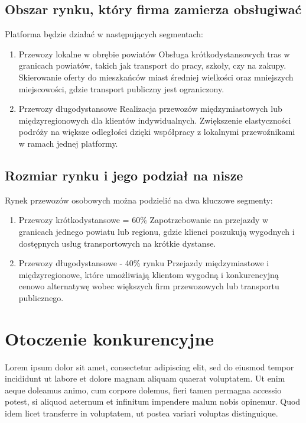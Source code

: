 \subsection{Obszar rynku, który firma zamierza obsługiwać}
Platforma będzie działać w następujących segmentach:
\begin{enumerate}
     
    \item Przewozy lokalne w obrębie powiatów
        Obsługa krótkodystansowych tras w granicach powiatów, takich jak transport do pracy, szkoły, czy na zakupy.
        Skierowanie oferty do mieszkańców miast średniej wielkości oraz mniejszych miejscowości, gdzie transport publiczny jest ograniczony.

    \item Przewozy długodystansowe
        Realizacja przewozów międzymiastowych lub międzyregionowych dla klientów indywidualnych.
        Zwiększenie elastyczności podróży na większe odległości dzięki współpracy z lokalnymi przewoźnikami w ramach jednej platformy.
 
\end{enumerate}      

\subsection{Rozmiar rynku i jego podział na nisze}
    Rynek przewozów osobowych można podzielić na dwa kluczowe segmenty:
    \begin{enumerate}
        \item Przewozy krótkodystansowe = 60\%
            Zapotrzebowanie na przejazdy w granicach jednego powiatu lub regionu, gdzie klienci poszukują wygodnych i dostępnych usług transportowych na krótkie dystanse.
        \item Przewozy długodystansowe - 40\% rynku
            Przejazdy międzymiastowe i międzyregionowe, które umożliwiają klientom wygodną i konkurencyjną cenowo alternatywę wobec większych firm przewozowych lub transportu publicznego.
    \end{enumerate}

    
\section{Otoczenie konkurencyjne}

Lorem ipsum dolor sit amet, consectetur adipiscing elit, sed do eiusmod tempor incididunt ut labore et dolore magnam aliquam quaerat voluptatem. Ut enim aeque doleamus animo, cum corpore dolemus, fieri tamen permagna accessio potest, si aliquod aeternum et infinitum impendere malum nobis opinemur. Quod idem licet transferre in voluptatem, ut postea variari voluptas distinguique.


